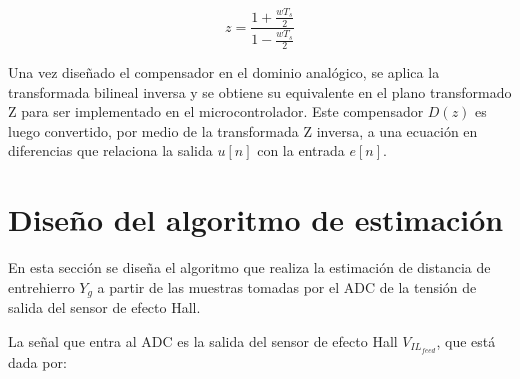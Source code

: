\begin{equation*}
	z=\frac{1+\frac{wT_s}{2}}{1-\frac{wT_s}{2}}
\end{equation*}



Una vez diseñado el compensador en el dominio analógico, se aplica la transformada bilineal inversa y se obtiene su equivalente en el plano transformado Z para ser implementado en el microcontrolador. Este compensador $D(z)$ es luego convertido, por medio de la transformada Z inversa, a una ecuación en diferencias que relaciona la salida $u[n]$ con la entrada $e[n]$. 


%
%
%
%
%



\section{Diseño del algoritmo de estimación}

En esta sección se diseña el algoritmo que realiza la estimación de distancia de entrehierro $Y_g$ a partir de las muestras tomadas por el ADC de la tensión de salida del sensor de efecto Hall.

La señal que entra al ADC es la salida del sensor de efecto Hall $V_{IL_{feed}}$, que está dada por:

